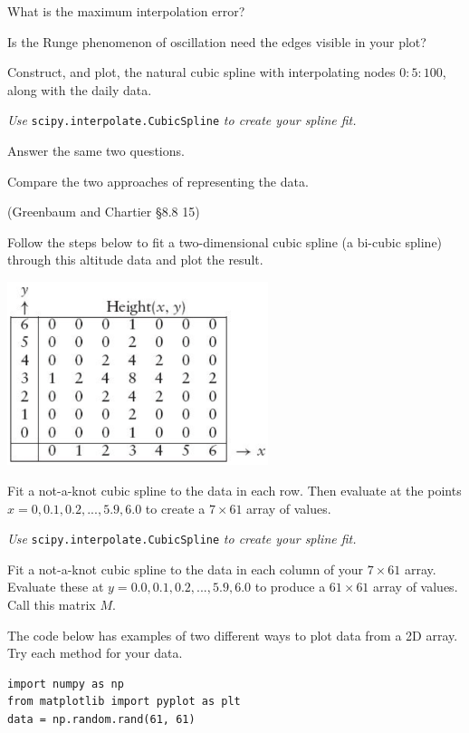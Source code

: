 \documentclass[12pt,letterpaper,noanswers]{exam}
\begin{document}
\begin{questions}
\begin{parts}
What is the maximum interpolation error?  

Is the Runge phenomenon of oscillation need the edges visible in your plot?
\item Construct, and plot, the natural cubic spline with interpolating nodes $0:5:100$, along with the daily data.

\emph{Use} \texttt{scipy.interpolate.CubicSpline} \emph{to create your spline fit.}

Answer the same two questions. 

\item Compare the two approaches of representing the data.
\end{parts}


\item (Greenbaum and Chartier \S 8.8 15)

Follow the steps below to fit a two-dimensional cubic spline (a bi-cubic spline) through this altitude data and plot the result.

\includegraphics[width=3in]{img/PSet05hill.png}

\begin{parts}
\item Fit a not-a-knot cubic spline to the data in each row.  Then evaluate at the points $x = 0,0.1,0.2,...,5.9,6.0$ to create a $7\times 61$ array of values.

\emph{Use} \texttt{scipy.interpolate.CubicSpline} \emph{to create your spline fit.}
\item Fit a not-a-knot cubic spline to the data in each column of your $7\times 61$ array.  Evaluate these at $y = 0.0,0.1,0.2,...,5.9,6.0$ to produce a $61\times 61$ array of values.  Call this matrix $M$.
\item The code below has examples of two different ways to plot data from a 2D array.  Try each method for your data.
\begin{verbatim}
import numpy as np
from matplotlib import pyplot as plt
data = np.random.rand(61, 61)


\end{verbatim}
\end{parts}
\end{questions}
\end{document}
